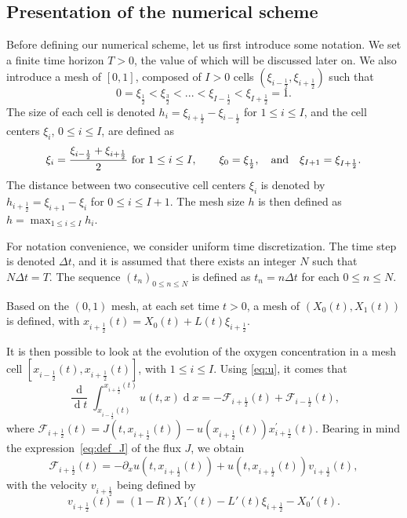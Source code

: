 \documentclass{amsart}
\newcommand\dd{{\operatorname{d}}}
\newcommand\dt{\Delta t}
\newcommand\h[1]{h_{#1 \frac{1}{2}}}
\renewcommand\v[2]{v_{#1 \frac{1}{2}}^{#2}}
\newcommand\x[2]{x_{#1 \frac{1}{2}}^{#2}}
\renewcommand\d[1]{\partial_{#1}}
\begin{document}
\subsection{Presentation of the numerical scheme}
	
	
Before defining our numerical scheme, let us first introduce some notation. We set a finite time horizon $T>0$, the value of which will be discussed later on. 
We also introduce a mesh of $[0,1]$, composed of $I > 0$ cells $(\xi_{i-\frac{1}{2}}, \xi_{i+\frac{1}{2}})$ such that
	\begin{equation*}
		0 = \xi_{\frac{1}{2}} < \xi_{\frac{3}{2}} < ... < \xi_{I- \frac{1}{2}} < \xi_{I+ \frac{1}{2}} = 1.
	\end{equation*}
	The size of each cell is denoted $h_i =\xi_{i+\frac{1}{2}} - \xi_{i-\frac{1}{2}}$ for $1 \leq i \leq I$, and the cell centers $\xi_i$, $0 \leq i \leq I$, are defined as 
	\[
	\xi_i = \frac{\xi_{i-\frac{1}{2}} + \xi_{i+\frac{1}{2}}}{2} \textnormal{ for } 1 \leq i \leq I, \qquad \xi_0 = \xi_{\frac{1}{2}}, \quad \text{and}\quad \xi_{I+1} = \xi_{I+ \frac{1}{2}}.
	\]
The distance between two consecutive cell centers $\xi_i$ is denoted by  $\h{i+}{} = \xi_{i+1} - \xi_i$ for $0 \leq i \leq I+1$. 
The mesh size $h$ is then defined as $h=\max_{1 \leq i \leq I} h_i$.

For notation convenience, we consider uniform time discretization. 
The time step is denoted $\dt$, and it is assumed that there exists an integer $N$ such that $N \dt = T$. The sequence $(t_n)_{0 \leq n \leq N}$ is defined as $t_n = n \dt$ for each $0 \leq n \leq N$. 
	
	Based on the $(0,1)$ mesh, at each set time $t > 0$, a mesh of $(X_0(t), X_1(t))$ is defined, with
	\(
		\x{i+}{}(t) = X_0(t) + L(t) \xi_{i+\frac{1}{2}}.
	\)
	
	
	It is then possible to look at the evolution of the oxygen concentration in a mesh cell $[\x{i-}{}(t),\x{i+}{}(t)]$, with $1 \leq i \leq I$. Using \eqref{eq:u}, it comes that
	\begin{equation} \label{eq:cons_mass}
		\frac{\dd}{\dd t} \int_{\x{i-}{}(t)}^{\x{i+}{}(t)} u(t,x) \dd x = - \mathcal{F}_{i+\frac{1}{2}}(t) + \mathcal{F}_{i-\frac{1}{2}}(t),
	\end{equation}
	where
	$\mathcal{F}_{i+\frac{1}{2}}(t) = J(t, \x{i+}{}(t)) - u(\x{i+}{}(t))\x{i+}{'}(t).$
	Bearing in mind the expression~\eqref{eq:def_J} of the flux $J$, we obtain
	\begin{equation*}
		\mathcal{F}_{i+\frac{1}{2}}(t) = - \d{x}u(t, \x{i+}{}(t)) + u(t, \x{i+}{}(t))\v{i+}{}(t), 
	\end{equation*}
	with the velocity $\v{i+}{}$ being defined by 
	\begin{equation}\label{eq:vi+1/2.cont}
		\v{i+}{}(t) = (1- R) X_1'(t) - L'(t)\xi_{i+\frac{1}{2}} - X_0'(t).
	\end{equation}
	
\end{document}
